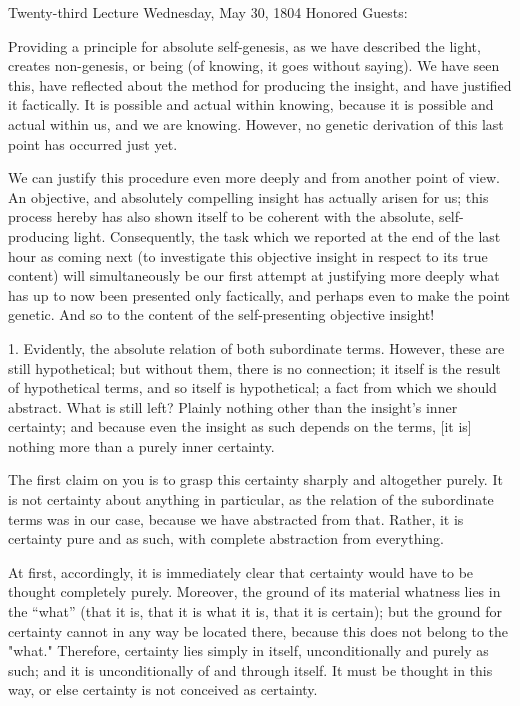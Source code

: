 Twenty-third Lecture
Wednesday, May 30, 1804
Honored Guests:

Providing a principle for absolute self-genesis,
as we have described the light, creates non-genesis,
or being (of knowing, it goes without saying).
We have seen this, have reflected about
the method for producing the insight,
and have justified it factically.
It is possible and actual within knowing,
because it is possible and actual within us,
and we are knowing.
However, no genetic derivation of
this last point has occurred just yet.

We can justify this procedure even more deeply
and from another point of view.
An objective, and absolutely compelling insight
has actually arisen for us;
this process hereby has also shown itself
to be coherent with the absolute, self-producing light.
Consequently, the task which we reported
at the end of the last hour as coming next
(to investigate this objective insight
in respect to its true content)
will simultaneously be our first attempt at justifying more deeply
what has up to now been presented only factically,
and perhaps even to make the point genetic.
And so to the content of the self-presenting objective insight!

1. Evidently, the absolute relation of both subordinate terms.
However, these are still hypothetical;
but without them, there is no connection;
it itself is the result of hypothetical terms,
and so itself is hypothetical;
a fact from which we should abstract.
What is still left?
Plainly nothing other than the insight's inner certainty;
and because even the insight as such depends on the terms,
[it is] nothing more than a purely inner certainty.

The first claim on you is to grasp
this certainty sharply and altogether purely.
It is not certainty about anything in particular,
as the relation of the subordinate terms was in our case,
because we have abstracted from that.
Rather, it is certainty pure and as such,
with complete abstraction from everything.

At first, accordingly, it is immediately clear
that certainty would have to be thought completely purely.
Moreover, the ground of its material whatness lies in the “what”
(that it is, that it is what it is, that it is certain);
but the ground for certainty cannot in any way be located there,
because this does not belong to the "what."
Therefore, certainty lies simply in itself,
unconditionally and purely as such;
and it is unconditionally of and through itself.
It must be thought in this way,
or else certainty is not conceived as certainty.

